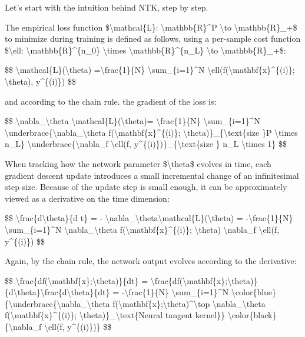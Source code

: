 Let's start with the intuition behind NTK, step by step.

The empirical loss function \$\textbackslash mathcal\{L\}: \textbackslash mathbb\{R\}\^{}P \textbackslash to \textbackslash mathbb\{R\}\_+\$ to minimize during training is defined as follows, using a per-sample cost function \$\textbackslash ell: \textbackslash mathbb\{R\}\^{}\{n\_0\} \textbackslash times \textbackslash mathbb\{R\}\^{}\{n\_L\} \textbackslash to \textbackslash mathbb\{R\}\_+\$:

\$\$ \textbackslash mathcal\{L\}(\textbackslash theta) =\textbackslash frac\{1\}\{N\} \textbackslash sum\_\{i=1\}\^{}N \textbackslash ell(f(\textbackslash mathbf\{x\}\^{}\{(i)\}; \textbackslash theta), y\^{}\{(i)\}) \$\$

and according to the chain rule. the gradient of the loss is:

\$\$ \textbackslash nabla\_\textbackslash theta \textbackslash mathcal\{L\}(\textbackslash theta)= \textbackslash frac\{1\}\{N\} \textbackslash sum\_\{i=1\}\^{}N \textbackslash underbrace\{\textbackslash nabla\_\textbackslash theta f(\textbackslash mathbf\{x\}\^{}\{(i)\}; \textbackslash theta)\}\_\{\textbackslash text\{size \}P \textbackslash times n\_L\} \textbackslash underbrace\{\textbackslash nabla\_f \textbackslash ell(f, y\^{}\{(i)\})\}\_\{\textbackslash text\{size \} n\_L \textbackslash times 1\} \$\$

When tracking how the network parameter \$\textbackslash theta\$ evolves in time, each gradient descent update introduces a small incremental change of an infinitesimal step size. Because of the update step is small enough, it can be approximately viewed as a derivative on the time dimension:

\$\$ \textbackslash frac\{d\textbackslash theta\}\{d t\} = - \textbackslash nabla\_\textbackslash theta\textbackslash mathcal\{L\}(\textbackslash theta) = -\textbackslash frac\{1\}\{N\} \textbackslash sum\_\{i=1\}\^{}N \textbackslash nabla\_\textbackslash theta f(\textbackslash mathbf\{x\}\^{}\{(i)\}; \textbackslash theta) \textbackslash nabla\_f \textbackslash ell(f, y\^{}\{(i)\}) \$\$

Again, by the chain rule, the network output evolves according to the derivative:

\$\$ \textbackslash frac\{df(\textbackslash mathbf\{x\};\textbackslash theta)\}\{dt\} = \textbackslash frac\{df(\textbackslash mathbf\{x\};\textbackslash theta)\}\{d\textbackslash theta\}\textbackslash frac\{d\textbackslash theta\}\{dt\} = -\textbackslash frac\{1\}\{N\} \textbackslash sum\_\{i=1\}\^{}N \textbackslash color\{blue\}\{\textbackslash underbrace\{\textbackslash nabla\_\textbackslash theta f(\textbackslash mathbf\{x\};\textbackslash theta)\^{}\textbackslash top \textbackslash nabla\_\textbackslash theta f(\textbackslash mathbf\{x\}\^{}\{(i)\}; \textbackslash theta)\}\_\textbackslash text\{Neural tangent kernel\}\} \textbackslash color\{black\}\{\textbackslash nabla\_f \textbackslash ell(f, y\^{}\{(i)\})\} \$\$

